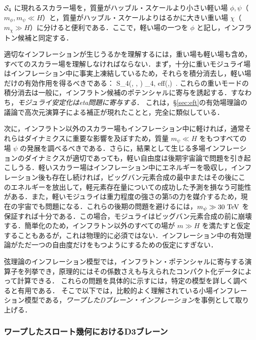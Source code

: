 ${\cal S}_4$ に現れるスカラー場を，質量がハッブル・スケールより小さい軽い場 $\phi,\psi$（$m_\phi, m_\psi \ll H$）と，質量がハッブル・スケールよりはるかに大きい重い場 $\chi$（$m_\chi \gg H$）に分けると便利である．ここで，軽い場の一つを $\phi$ と記し，インフラトン候補と同定する．

適切なインフレーションが生じうるかを理解するには，重い場も軽い場も含め，すべてのスカラー場を理解しなければならない．まず，十分に重いモジュライ場はインフレーション中に事実上凍結しているため，それらを積分消去し，軽い場だけの有効作用を得るべきである：
\beq
{\cal S}_4(\phi, \psi, \chi) \quad \to {}_{4, \rm eff}(\phi,\psi)\, .
\eeq
これらの重いモードの積分消去は一般に，インフラトン候補のポテンシャルに寄与を誘起する．すなわち，{\it モジュライ安定化はeta問題に寄与する}．
これは，\S\ref{sec:eft}の有効場理論の議論で高次元演算子による補正が現れたことと，完全に類似している．

次に，インフラトン以外のスカラー場もインフレーション中に軽ければ，通常それらはダイナミクスに重要な影響を及ぼすため，質量 $m_\psi \ll H$ をもつすべての場 $\psi$ の発展を調べるべきである．さらに，結果として生じる多場インフレーションのダイナミクスが適切であっても，軽い自由度は後期宇宙論で問題を引き起こしうる．軽いスカラー場はインフレーション中にエネルギーを吸収し，インフレーション後も存在し続ければ，ビッグバン元素合成の最中またはその後にこのエネルギーを放出して，軽元素存在量についての成功した予測を損なう可能性がある．また，軽いモジュライは重力程度の強さの第5の力を媒介するため，現在の宇宙でも問題になる．これらの後期の問題を避けるには，$m_\psi \gg 30 ~\rm{TeV}$ を保証すれば十分である．この場合，モジュライはビッグバン元素合成の前に崩壊する．簡単化のため，インフラトン以外のすべての場が $m \gg H$ を満たすと仮定することもあるが，これは物理的に必須ではない．インフレーション中の有効理論がただ一つの自由度だけをもつようにするための仮定にすぎない．



\label{sec:warped}

弦理論のインフレーション模型では，インフラトン・ポテンシャルに寄与する演算子を列挙でき，原理的にはその係数さえも与えられたコンパクト化データによって計算できる．
これらの問題を具体的に示すには，特定の模型を詳しく調べると有用である．
そこで以下では，比較的よく理解されている小場インフレーション模型である，{\it{ワープしたDブレーン・インフレーション}}を事例として取り上げる．

\subsubsection{ワープしたスロート幾何におけるD3ブレーン}

